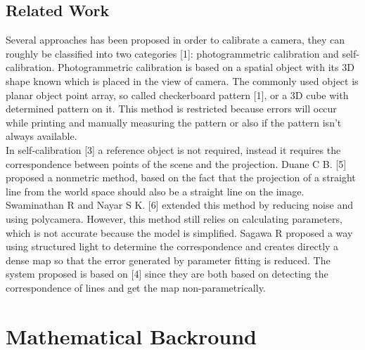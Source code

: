\documentclass[journal,final,a4paper,twoside]{PS}
\begin{document}
\subsection{Related Work}
\label{sec:related}
Several approaches has been proposed in order to calibrate a camera, they can roughly be classified into two categories [1]: photogrammetric calibration and self-calibration.
Photogrammetric calibration is based on a spatial object with its 3D shape known which is placed in the view of camera. The commonly used object is planar object point array, so called checkerboard pattern [1], or a 3D cube with determined pattern on it. This method is restricted because errors will occur while printing and manually measuring the pattern or also if the pattern isn't always available.\\
In self-calibration [3] a reference object is not required, instead it requires the correspondence between points of the scene and the projection. Duane C B. [5] proposed a nonmetric method, based on the fact that the projection of a straight line from the world space should also be a straight line on the image. Swaminathan R and Nayar S K. [6] extended this method by reducing noise and using polycamera. However, this method still relies on calculating parameters, which is not accurate because the model is simplified. 
Sagawa R  proposed a way using structured light to determine the correspondence and creates directly a dense map so that the error generated by parameter fitting is reduced. 
The system proposed is based on [4] since they are both based on detecting the correspondence of lines and get the map non-parametrically. %

\section{Mathematical Backround}
\label{sec:maths}
\end{document}
